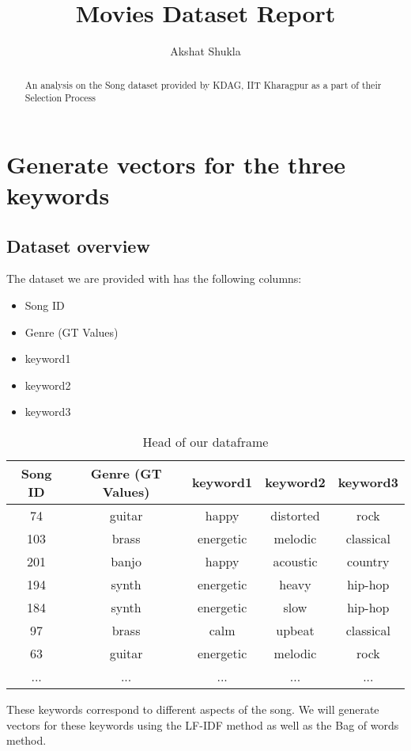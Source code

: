 \documentclass{article}
\title{Movies Dataset Report}
\author{Akshat Shukla}
\begin{document}
\maketitle

\begin{abstract}
An analysis on the Song dataset provided by KDAG, IIT Kharagpur as a part of their Selection Process
\end{abstract}

\section{Generate vectors for the three keywords}
\subsection{Dataset overview}
The dataset we are provided with has the following columns:
\begin{itemize}
    \item Song ID
    \item Genre (GT Values)
    \item keyword1
    \item keyword2
    \item keyword3
\end{itemize}
\begin{table}[h]
\centering
\begin{tabular}{|c|c|c|c|c|}
    \hline
    \textbf{Song ID} & \textbf{Genre (GT Values)} & \textbf{keyword1} & \textbf{keyword2} & \textbf{keyword3} \\
    \hline
    74 & guitar & happy & distorted & rock \\
    103 & brass & energetic & melodic & classical \\
    201 & banjo & happy & acoustic & country \\
    194 & synth & energetic & heavy & hip-hop \\
    184 & synth & energetic & slow & hip-hop \\
    97 & brass & calm & upbeat & classical \\
    63 & guitar & energetic & melodic & rock \\
    ... & ... & ... & ... & ... \\
    \hline
\end{tabular}
\caption{Head of our dataframe}
\label{fig:head_of_dataframe}
\end{table}

These keywords correspond to different aspects of the song. We will generate vectors for these keywords using the LF-IDF method as well as the Bag of words method.
\end{document}
